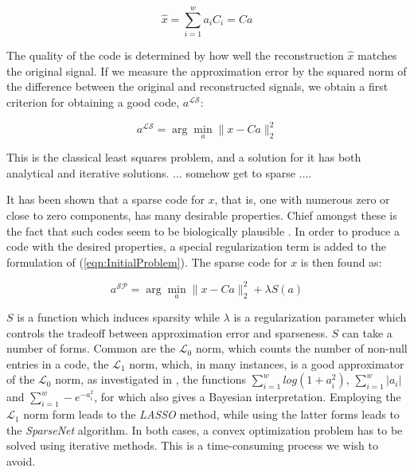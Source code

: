 \documentclass[runningheads,a4paper]{llncs}
\begin{document}
\begin{equation*}
\hat{x} = \sum_{i=1}^w {a_i C_i} = Ca
\end{equation*}

The quality of the code is determined by how well the reconstruction $\hat{x}$ matches the original signal. If we measure the approximation error by the squared norm of the difference between the original and reconstructed signals, we obtain a first criterion for obtaining a good code, $a^\mathcal{LS}$:

\begin{equation}
\label{eqn:InitialProblem}
a^\mathcal{LS} = \arg \min_a \| x - Ca \|_2^2
\end{equation}

This is the classical least squares problem, and a solution for it has both analytical and iterative solutions. $\dots$ somehow get to sparse $\dots$.

It has been shown that a sparse code for $x$, that is, one with numerous zero or close to zero components, has many desirable properties. Chief amongst these is the fact that such codes seem to be biologically plausible \cite{emergence,strategyv1}. In order to produce a code with the desired properties, a special regularization term is added to the formulation of (\ref{eqn:InitialProblem}). The sparse code for $x$ is then found as:

\begin{equation}
\label{eqn:SparseProblem}
a^\mathcal{SP} = \arg \min_a \| x - Ca \|_2^2 + \lambda S(a)
\end{equation}

$S$ is a function which induces sparsity while $\lambda$ is a regularization parameter which controls the tradeoff between approximation error and sparseness. $S$ can take a number of forms. Common are the $\mathcal{L}_0$ norm, which counts the number of non-null entries in a code, the $\mathcal{L}_1$ norm, which, in many instances, is a good approximator of the $\mathcal{L}_0$ norm, as investigated in \cite{minimall1}, the functions $\sum_{i=1}^w log(1 + a_i^2)$, $\sum_{i=1}^w \left|a_i\right|$ and $\sum_{i=1}^w -e^{-a_i^2}$, for which \cite{strategyv1} also gives a Bayesian interpretation. Employing the $\mathcal{L}_1$ norm form leads to the \emph{LASSO} method, while using the latter forms leads to the \emph{SparseNet} algorithm. In both cases, a convex optimization problem has to be solved using iterative methods. This is a time-consuming process we wish to avoid.
\end{document}
